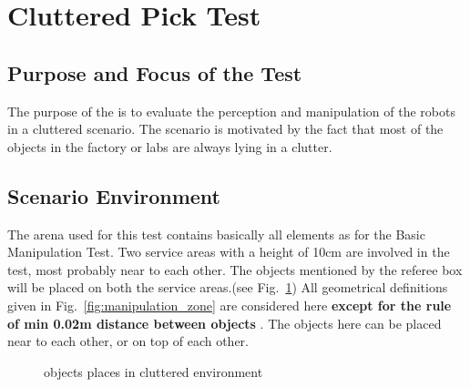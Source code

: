 \newpage
\section{Cluttered Pick Test}


\subsection{Purpose and Focus of the Test}
The purpose of the  is to evaluate the perception
and manipulation of the robots in a cluttered scenario. The scenario is motivated by
the fact that most of the objects in the factory or labs are always lying in a clutter.


\subsection{Scenario Environment}
The arena used for this test contains basically all elements as for the Basic
Manipulation Test. Two service areas with a height of 10cm are involved in the test,
most probably near to each other. The objects mentioned by the referee box will be placed
on both the service areas.(see Fig.~\ref{fig:clutter})
All geometrical definitions given in Fig.~\ref{fig:manipulation_zone} are considered here \textbf{except
for the rule of min 0.02m distance between objects} . The objects here can be placed near to each other,
or on top of each other.

\begin{figure} [h!]
\begin{center}
 \hspace{1cm}
\end{center}
\caption{objects places in cluttered environment}
\label{fig:clutter}
\end{figure}


